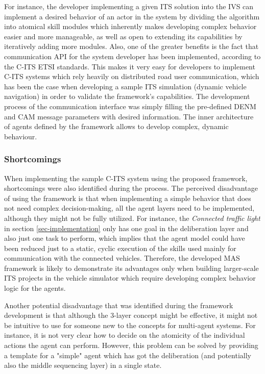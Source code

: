 \documentclass[0main.tex]{subfiles}
\begin{document}
For instance, the developer implementing a given ITS solution into the IVS can implement a
desired behavior of an actor in the system by dividing the algorithm into atomical skill
modules which inherently makes developing complex behavior easier and more manageable, as well
as open to extending its capabilities by iteratively adding more modules. Also, one of the
greater benefits is the fact that communication API  for the system developer has been
implemented, according to the C-ITS ETSI standards. This makes it very easy for developers to
implement C-ITS systems which rely heavily on distributed road user communication, which has
been the case when developing a sample ITS simulation (dynamic vehicle navigation) in order to
validate the framework's capabilities.  The development process of the communication interface
was simply filling the pre-defined DENM and CAM message parameters with desired information.
The inner architecture of agents defined by the framework allows to develop complex, dynamic
behaviour.

\subsubsection{Shortcomings}

When implementing the sample C-ITS system using the proposed framework, shortcomings were also
identified during the process. The perceived disadvantage of using the framework is that when
implementing a simple behavior that does not need complex decision-making, all the agent layers
need to be implemented, although they might not be fully utilized. For instance, the
\emph{Connected traffic light} in section \ref{sec-implementation} only has one goal in the
deliberation layer and also just one task to perform, which implies that the agent model could
have been reduced just to a static, cyclic execution of the skills used mainly for
communication with the connected vehicles. Therefore, the developed MAS framework is likely to
demonstrate its advantages only when building larger-scale ITS projects in the vehicle
simulator which require developing complex behavior logic for the agents. 

Another potential disadvantage that was identified during the framework development is that
although the 3-layer concept might be effective, it might not be intuitive to use for someone
new to the concepts for multi-agent systems. For instance, it is not very clear how to decide
on the atomicity of the individual actions the agent can perform. However, this problem can be
solved by providing a template for a "simple" agent which has got the deliberation (and
potentially also the middle sequencing layer) in a single state. 
\end{document}
